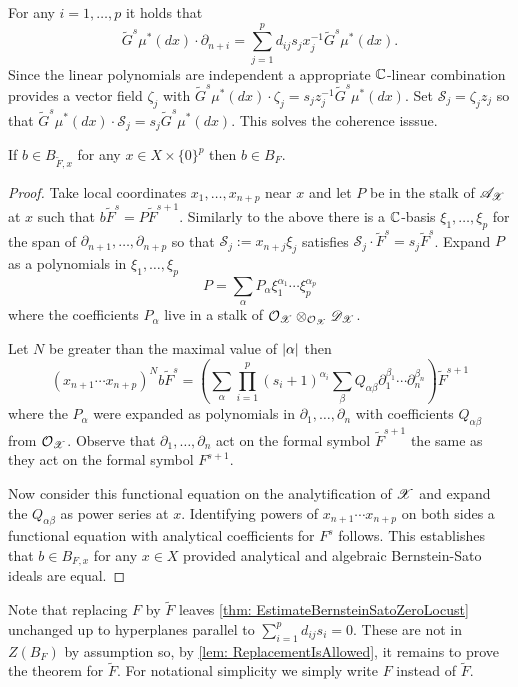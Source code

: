 For any $i=1,\ldots,p$ it holds that
$$\widetilde{G}^s \mu^*(dx)\cdot \partial_{n+i} = \sum_{j=1}^p d_{ij}s_j x_j^{-1} \widetilde{G}^s \mu^*(dx).$$
Since the linear polynomials are independent a appropriate $\mathbb{C}$-linear combination provides a vector field $\zeta_j$ with $\widetilde{G}^s \mu^*(dx)\cdot \zeta_j = s_{j}z_j^{-1}\widetilde{G}^s \mu^*(dx)$.
Set $\mathcal{S}_j = \zeta_jz_j$ so that $\widetilde{G}^s \mu^*(dx) \cdot \mathcal{S}_j = s_j \widetilde{G}^s \mu^*(dx) $.
This solves the coherence isssue.
\begin{lemma}\label{lem: ReplacementIsAllowed}
  If $b\in B_{\widetilde{F},x}$ for any $x\in X\times \{0\}^p$ then $b \in B_F$.
\end{lemma}
\begin{proof}
  Take local coordinates $x_1,\ldots, x_{n+p}$ near $x$ and let $P$ be in the stalk of $\mathscr{A}_{\mathscr{X}}$ at $x$ such that $b \widetilde{F}^s = P \widetilde{F}^{s+1}$.
  Similarly to the above there is a $\mathbb{C}$-basis $\xi_1,\ldots,\xi_p$ for the span of $\partial_{n+1}, \ldots, \partial_{n+p}$ so that $\mathcal{S}_j := x_{n+j}\xi_j$ satisfies $\mathcal{S}_j \cdot \widetilde{F}^s = s_{j}\widetilde{F}^s$.
  Expand $P$ as a polynomials in $\xi_1,\ldots,\xi_p$
  $$P = \sum_{\alpha} P_\alpha \xi_{1}^{\alpha_1}\cdots \xi_{p}^{\alpha_p}$$
  where the coefficients $P_\alpha$ live in a stalk of $\mathcal{O}_{\mathscr{X}}\otimes_{\mathcal{O}_{\mathscr{X}}}\mathscr{D}_{\mathscr{X}}$.

  Let $N$ be greater than the maximal value of $\vert \alpha \vert$ then
  $$(x_{n+1}\cdots x_{n+p})^N b \widetilde{F}^s = \left(\sum_{\alpha} \prod_{i=1}^p (s_i + 1)^{\alpha_i} \sum_\beta Q_{\alpha\beta} \partial_1^{\beta_1}\cdots \partial_n^{\beta_n} \right)\widetilde{F}^{s+1}$$
  where the $P_\alpha$ were expanded as polynomials in $\partial_1,\ldots,\partial_n$ with coefficients $Q_{\alpha\beta}$ from $\mathcal{O}_{\mathscr{X}}$.
  Observe that $\partial_1,\ldots, \partial_n$ act on the formal symbol $\widetilde{F}^{s+1}$ the same as they act on the formal symbol $F^{s+1}$.

  Now consider this functional equation on the analytification of $\mathscr{X}$ and expand the $Q_{\alpha\beta}$ as power series at $x$.
  Identifying powers of $x_{n+1}\cdots x_{n+p}$ on both sides a functional equation with analytical coefficients for $F^s$ follows.
  This establishes that $b \in B_{F,x}$ for any $x\in X$ provided analytical and algebraic Bernstein-Sato ideals are equal.
\end{proof}
Note that replacing $F$ by $\widetilde{F}$ leaves \cref{thm: EstimateBernsteinSatoZeroLocust} unchanged up to hyperplanes parallel to $\sum_{i=1}^p d_{ij}s_i = 0$.
These are not in $Z(B_F)$ by assumption so, by \cref{lem: ReplacementIsAllowed}, it remains to prove the theorem for $\widetilde{F}$.
For notational simplicity we simply write $F$ instead of $\widetilde{F}$.

